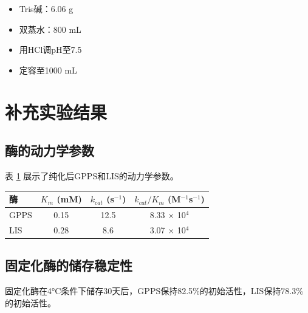 \begin{itemize}
    \item Tris碱：6.06 g
    \item 双蒸水：800 mL
    \item 用HCl调pH至7.5
    \item 定容至1000 mL
\end{itemize}

\section{补充实验结果}


\subsection{酶的动力学参数}

表 \ref{tab:kinetics} 展示了纯化后GPPS和LIS的动力学参数。

\begin{table}[h]
  \centering
  \label{tab:kinetics}
  \begin{tabular}{lccc}
    \toprule
    \textbf{酶} & \textbf{$K_m$ (mM)} & \textbf{$k_{cat}$ (s$^{-1}$)} & \textbf{$k_{cat}/K_m$ (M$^{-1}$s$^{-1}$)} \\
    \midrule
    GPPS & 0.15 & 12.5 & 8.33 $\times$ 10$^4$ \\
    LIS & 0.28 & 8.6 & 3.07 $\times$ 10$^4$ \\
    \bottomrule
  \end{tabular}
\end{table}

\subsection{固定化酶的储存稳定性}

固定化酶在4°C条件下储存30天后，GPPS保持82.5\%的初始活性，LIS保持78.3\%的初始活性。
